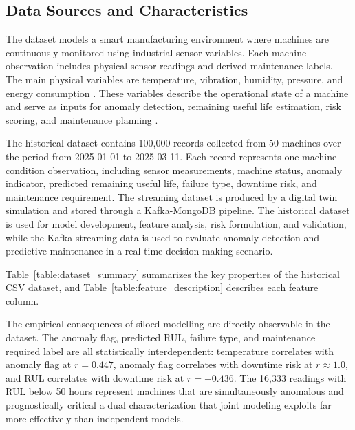 \subsection{Data Sources and Characteristics}

The dataset models a smart manufacturing environment where machines are continuously monitored using industrial sensor variables. Each machine observation includes physical sensor readings and derived maintenance labels. The main physical variables are temperature, vibration, humidity, pressure, and energy consumption \cite{widartha_smart_lighting_2024}. These variables describe the operational state of a machine and serve as inputs for anomaly detection, remaining useful life estimation, risk scoring, and maintenance planning \cite{widartha_hiper_chad_2025}.

The historical dataset contains 100,000 records collected from 50 machines over the period from 2025-01-01 to 2025-03-11. Each record represents one machine condition observation, including sensor measurements, machine status, anomaly indicator, predicted remaining useful life, failure type, downtime risk, and maintenance requirement. The streaming dataset is produced by a digital twin simulation and stored through a Kafka-MongoDB pipeline. The historical dataset is used for model development, feature analysis, risk formulation, and validation, while the Kafka streaming data is used to evaluate anomaly detection and predictive maintenance in a real-time decision-making scenario.



Table~\ref{table:dataset_summary} summarizes the key properties of the historical CSV dataset, and Table~\ref{table:feature_description} describes each feature column.

The empirical consequences of siloed modelling are directly observable in the dataset. The anomaly flag, predicted RUL, failure type, and maintenance required label are all statistically interdependent: temperature correlates with anomaly flag at $r = 0.447$, anomaly flag correlates with downtime risk at $r \approx 1.0$, and RUL correlates with downtime risk at $r = -0.436$. The 16,333 readings with RUL below 50 hours represent machines that are simultaneously anomalous and prognostically critical a dual characterization that joint modeling exploits far more effectively than independent models.






